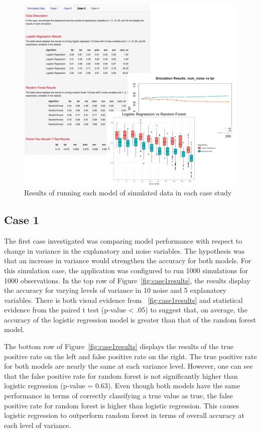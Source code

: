\documentclass{llncs}
\begin{document}
\begin{figure}
\centering
\includegraphics[scale=0.75]{center-content.png}
\caption{Results of running each model of simulated data in each case study}
\label{fig:center-content}
\end{figure}

\subsection{Case 1}

The first case investigated was comparing model performance with respect to change in variance in the explanatory and noise variables. The hypothesis was that an increase in variance would strengthen the accuracy for both models. For this simulation case, the application was configured to run 1000 simulations for 1000 observations. In the top row of Figure~\ref{fig:case1results}, the results display the accuracy for varying levels of variance in 10 noise and 5 explanatory variables. There is both visual evidence from ~\ref{fig:case1results} and statistical evidence  from the paired t test (p-value < .05) to suggest that, on average, the accuracy of the logistic regression model is  greater than that of the random forest model. 

The bottom row of Figure~\ref{fig:case1results} displays the results of the true positive rate on the left and false positive rate on the right. The true positive rate for both models are nearly the same at each variance level.  However, one can see that the false positive rate for random forest is not significantly higher than logistic regression (p-value = 0.63).  Even though both models have the same performance in terms of correctly classifying a true value as true, the false positive rate for random forest is higher than logistic regression.  This causes logistic regression to outperform random forest in terms of overall accuracy at each level of variance.
\end{document}
